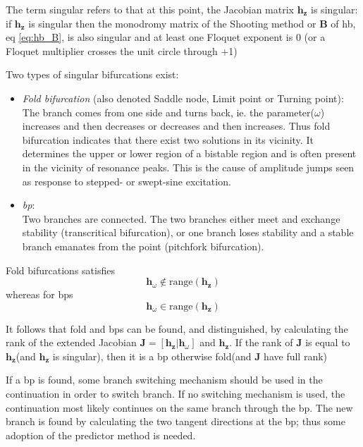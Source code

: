 The term singular refers to that at this point, the Jacobian matrix $\bm h_{\bm
  z}$ is singular: if $\bm h_{\bm z}$ is singular then the monodromy matrix of
the Shooting method or $\bm B$ of \gls{hb}, eq \eqref{eq:hb_B}, is also singular
and at least one Floquet exponent is 0 (or a Floquet multiplier crosses the unit
circle through +1)

Two types of singular bifurcations exist:

\begin{itemize}
\item \textit{Fold bifurcation} (also denoted Saddle node, Limit point or Turning
  point):\\
  The branch comes from one side and turns back, ie. the parameter($\omega$)
  increases and then decreases or decreases and then increases. Thus fold
  bifurcation indicates that there exist two solutions in its vicinity.
  It determines the upper or lower region of a bistable region and is often
  present in the vicinity of resonance peaks. This is the cause of amplitude
  jumps seen as response to stepped- or swept-sine excitation.
\item \textit{\gls{bp}}: \\
  Two branches are connected. The two branches either meet and exchange
  stability (transcritical bifurcation), or one branch loses stability and a
  stable branch emanates from the point (pitchfork bifurcation).
\end{itemize}

Fold bifurcations satisfies
\begin{equation}
  \bm h_\omega \notin \text{range} (\bm h_{\bm z})
\end{equation}
whereas for \glspl{bp}
\begin{equation}
  \bm h_\omega \in \text{range} (\bm h_{\bm z})
\end{equation}

It follows that fold and \glspl{bp} can be found, and distinguished, by
calculating the rank of the extended Jacobian $\bm J = [\bm h_{\bm z}|\bm
h_\omega]$ and $\bm h_{\bm z}$. If the rank of $\bm J$ is equal to $\bm h_{\bm
  z}$(and $\bm h_{\bm z}$ is singular), then it is a \gls{bp} otherwise fold(and
$\bm J$ have full rank)

If a \gls{bp} is found, some branch switching mechanism should be used in the
continuation in order to switch branch. If no switching mechanism is used, the
continuation most likely continues on the same branch through the \gls{bp}. The
new branch is found by calculating the two tangent directions at the \gls{bp};
thus some adoption of the predictor method is needed.


